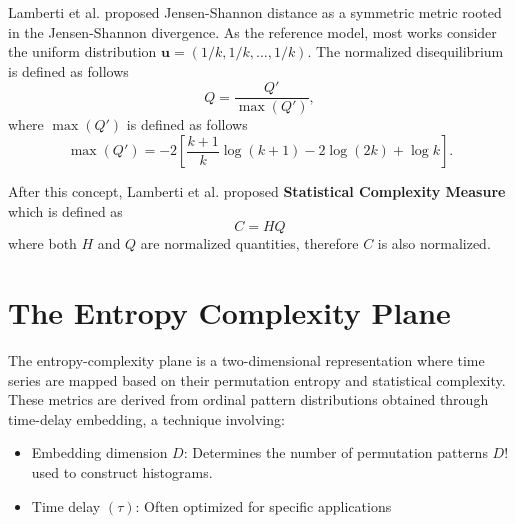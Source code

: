 Lamberti et al. \cite{lamberti2004intensive} proposed Jensen-Shannon distance as a symmetric metric rooted in the Jensen-Shannon divergence. As the reference model, most works consider the uniform distribution $\mathbf{u}=(1/k,1/k, \dots, 1/k)$. The normalized disequilibrium is defined as follows
\begin{equation}
	Q=\dfrac{Q'}{\max{(Q')}},
\end{equation}
where $\max(Q')$ is defined as follows
\begin{equation}
	\max(Q')=-2 \left[\dfrac{k+1}{k}\log(k+1)-2\log(2k)+\log k\right].
\end{equation}

After this concept, Lamberti et al. \cite{lamberti2004intensive} proposed \textbf{Statistical Complexity Measure} which is defined as 
\begin{equation}
	C=HQ
\end{equation}
where both $H$ and $Q$ are normalized quantities, therefore $C$ is also normalized. 


\section{The Entropy Complexity Plane} \label{Sec:EntropyComplexity}
The entropy-complexity plane is a two-dimensional representation where time series are mapped based on their permutation entropy and statistical complexity. These metrics are derived from ordinal pattern distributions obtained through time-delay embedding, a technique involving:
\begin{itemize}
	\item Embedding dimension $D$: Determines the number of permutation patterns $D!$ used to construct histograms.
	\item Time delay $(\tau)$: Often optimized for specific applications 
\end{itemize} 


